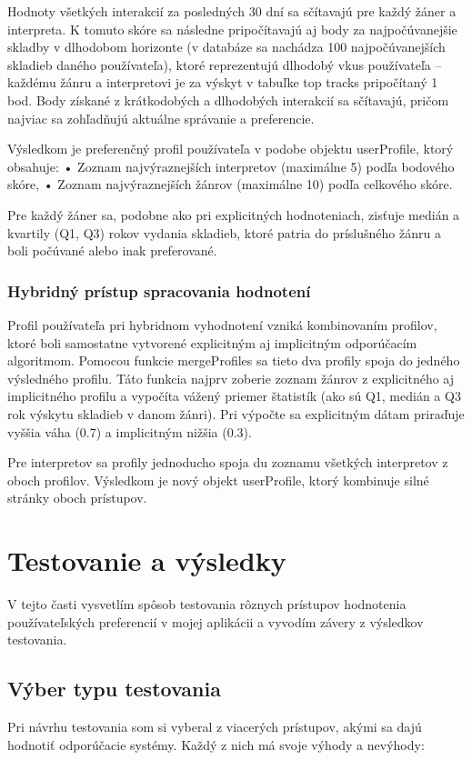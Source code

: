 Hodnoty všetkých interakcií za posledných 30 dní sa sčítavajú pre každý žáner a interpreta. K tomuto skóre sa následne pripočítavajú aj body za najpočúvanejšie skladby v dlhodobom horizonte (v databáze sa nachádza 100 najpočúvanejších skladieb daného používateľa), ktoré reprezentujú dlhodobý vkus používateľa – každému žánru a interpretovi je za výskyt v tabuľke top tracks pripočítaný 1 bod. Body získané z krátkodobých a dlhodobých interakcií sa sčítavajú, pričom najviac sa zohľadňujú aktuálne správanie a preferencie.

Výsledkom je preferenčný profil používateľa v podobe objektu userProfile, ktorý obsahuje:
	•	Zoznam najvýraznejších interpretov (maximálne 5) podľa bodového skóre,
	•	Zoznam najvýraznejších žánrov (maximálne 10) podľa celkového skóre.

Pre každý žáner sa, podobne ako pri explicitných hodnoteniach, zisťuje medián a kvartily (Q1, Q3) rokov vydania skladieb, ktoré patria do príslušného žánru a boli počúvané alebo inak preferované. 


\subsubsection{Hybridný prístup spracovania hodnotení}
Profil používateľa pri hybridnom vyhodnotení vzniká kombinovaním profilov, ktoré boli samostatne vytvorené explicitným aj implicitným odporúčacím algoritmom. Pomocou funkcie mergeProfiles sa tieto dva profily spoja do jedného výsledného profilu. Táto funkcia najprv zoberie zoznam žánrov z explicitného aj implicitného profilu a vypočíta vážený priemer štatistík (ako sú Q1, medián a Q3 rok výskytu skladieb v danom žánri). Pri výpočte sa  explicitným dátam priraďuje vyššia váha (0.7) a implicitným nižšia (0.3).

Pre interpretov sa profily jednoducho spoja du zoznamu všetkých interpretov z oboch profilov. Výsledkom je nový objekt userProfile, ktorý kombinuje silné stránky oboch prístupov.


\section{Testovanie a výsledky}\label{sec:TestovanieVysledky}
V tejto časti vysvetlím spôsob testovania rôznych prístupov hodnotenia používateľských preferencií v mojej aplikácii a vyvodím závery z výsledkov testovania.

\subsection{Výber typu testovania}
Pri návrhu testovania som si vyberal z viacerých prístupov, akými sa dajú hodnotiť odporúčacie systémy. Každý z nich má svoje výhody a nevýhody:
	
